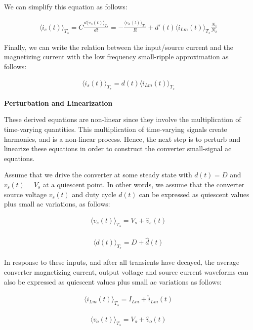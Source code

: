 We can simplify this equation as follows:

\begin{align}
    \langle i_c(t) \rangle_{T_s} = C\frac{d\langle v_o(t) \rangle_{T_s}}{dt} = -\frac{\langle v_o(t) \rangle_{T_s}}{R} + d'(t)\langle i_{Lm}(t) \rangle_{T_s}\frac{N_1}{N_2}
    \label{eqn:cap}
\end{align}

Finally, we can write the relation between the input/source current and the magnetizing current with the low frequency small-ripple approximation as follows:

\begin{align}
    \langle i_s(t) \rangle_{T_s} = d(t)\langle i_{Lm}(t) \rangle_{T_s}
    \label{eqn:scurr}
\end{align}

\textbf{Perturbation and Linearization}

These derived equations are non-linear since they involve the multiplication of time-varying quantities. This multiplication of time-varying signals create harmonics, and is a non-linear process. Hence, the next step is to perturb and linearize these equations in order to construct the converter small-signal ac equations.

Assume that we drive the converter at some steady state with $d(t) = D$ and $v_s(t) = V_s$ at a quiescent point. In other words, we assume that the converter source voltage $v_s(t)$ and duty cycle $d(t)$ can be expressed as quiescent values plus small ac variations, as follows:

\begin{align}
     \langle v_s(t) \rangle_{T_s} = V_s + \hat{v}_s(t)
\end{align}

\begin{align}
     \langle d(t) \rangle_{T_s} = D + \hat{d}(t)
\end{align}

In response to these inputs, and after all transients have decayed, the average converter magnetizing current, output voltage and source current waveforms can also be expressed as quiescent values plus small ac variations as follows:

\begin{align}
     \langle i_{Lm}(t) \rangle_{T_s} = I_{Lm} + \hat{i}_{Lm}(t)
\end{align}

\begin{align}
     \langle v_o(t) \rangle_{T_s} = V_o + \hat{v}_o(t)
\end{align}

